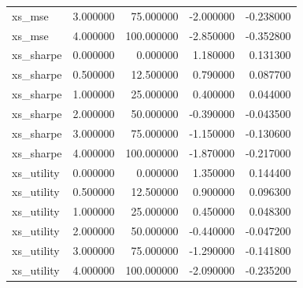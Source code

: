 \begin{table}
\begin{tabular}{lrrrr}
xs\_mse & 3.000000 & 75.000000 & -2.000000 & -0.238000 \\
xs\_mse & 4.000000 & 100.000000 & -2.850000 & -0.352800 \\
xs\_sharpe & 0.000000 & 0.000000 & 1.180000 & 0.131300 \\
xs\_sharpe & 0.500000 & 12.500000 & 0.790000 & 0.087700 \\
xs\_sharpe & 1.000000 & 25.000000 & 0.400000 & 0.044000 \\
xs\_sharpe & 2.000000 & 50.000000 & -0.390000 & -0.043500 \\
xs\_sharpe & 3.000000 & 75.000000 & -1.150000 & -0.130600 \\
xs\_sharpe & 4.000000 & 100.000000 & -1.870000 & -0.217000 \\
xs\_utility & 0.000000 & 0.000000 & 1.350000 & 0.144400 \\
xs\_utility & 0.500000 & 12.500000 & 0.900000 & 0.096300 \\
xs\_utility & 1.000000 & 25.000000 & 0.450000 & 0.048300 \\
xs\_utility & 2.000000 & 50.000000 & -0.440000 & -0.047200 \\
xs\_utility & 3.000000 & 75.000000 & -1.290000 & -0.141800 \\
xs\_utility & 4.000000 & 100.000000 & -2.090000 & -0.235200 \\
\bottomrule
\end{tabular}
\end{table}
